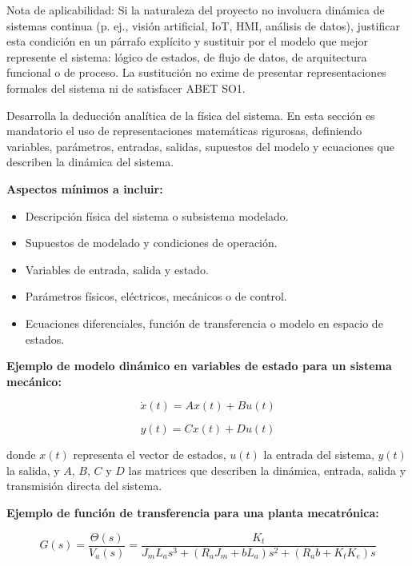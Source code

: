 \documentclass[12pt,letterpaper]{report}
\begin{document}
\begin{instrucciones}
\begin{advertenciaABET}
Nota de aplicabilidad: Si la naturaleza del proyecto no involucra dinámica de sistemas continua (p. ej., visión artificial, IoT, HMI, análisis de datos), justificar esta condición en un párrafo explícito y sustituir por el modelo que mejor represente el sistema: lógico de estados, de flujo de datos, de arquitectura funcional o de proceso. La sustitución no exime de presentar representaciones formales del sistema ni de satisfacer ABET SO1.
\end{advertenciaABET}

Desarrolla la deducción analítica de la física del sistema. En esta sección es mandatorio el uso de representaciones matemáticas rigurosas, definiendo variables, parámetros, entradas, salidas, supuestos del modelo y ecuaciones que describen la dinámica del sistema.

\vspace{2mm}
\noindent \textbf{Aspectos mínimos a incluir:}
\begin{itemize}
  \item Descripción física del sistema o subsistema modelado.
  \item Supuestos de modelado y condiciones de operación.
  \item Variables de entrada, salida y estado.
  \item Parámetros físicos, eléctricos, mecánicos o de control.
  \item Ecuaciones diferenciales, función de transferencia o modelo en espacio de estados.
\end{itemize}

\vspace{2mm}
\noindent \textbf{Ejemplo de modelo dinámico en variables de estado para un sistema mecánico:}

\[
\dot{x}(t) = A x(t) + B u(t)
\]

\[
y(t) = C x(t) + D u(t)
\]

\noindent donde $x(t)$ representa el vector de estados, $u(t)$ la entrada del sistema, $y(t)$ la salida, y $A$, $B$, $C$ y $D$ las matrices que describen la dinámica, entrada, salida y transmisión directa del sistema.

\vspace{2mm}
\noindent \textbf{Ejemplo de función de transferencia para una planta mecatrónica:}

\[
G(s) = \frac{\Theta(s)}{V_a(s)} = \frac{K_t}{J_m L_a s^3 + (R_a J_m + b L_a) s^2 + (R_a b + K_t K_e) s}
\]


\end{instrucciones}
\end{document}
